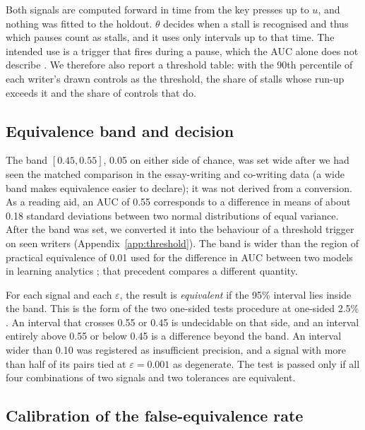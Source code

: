 Both signals are computed forward in time from the key presses up to $u$, and nothing was fitted to the holdout.
$\theta$ decides when a stall is recognised and thus which pauses count as stalls, and it uses only intervals up to that
time. The intended use is a trigger that fires during a pause, which the AUC alone does not
describe \cite{pelanek2015metrics}. We therefore also report a threshold table: with the 90th percentile of each
writer's drawn controls as the threshold, the share of stalls whose run-up exceeds it and the share of controls that do.

\subsection{Equivalence band and decision}

The band $[0.45, 0.55]$, 0.05 on either side of chance, was set wide after we had seen the matched comparison
in the essay-writing and co-writing data (a wide band makes equivalence easier to declare); it was not derived from a conversion. As a reading aid, an AUC of 0.55
corresponds to a difference in means of about 0.18 standard deviations between two normal distributions of equal
variance. After the band was set, we converted it into the behaviour of a threshold trigger on seen writers
(Appendix~\ref{app:threshold}). The band is wider than the region of practical equivalence of 0.01 used for the
difference in AUC between two models in learning analytics \cite{gardner2018evaluating}; that precedent compares a
different quantity.

For each signal and each $\varepsilon$, the result is \emph{equivalent} if the 95\% interval lies inside the band. This
is the form of the two one-sided tests procedure at one-sided 2.5\% \cite{lakens2017equivalence}. An interval that
crosses 0.55 or 0.45 is undecidable on that side, and an interval entirely above 0.55 or below 0.45 is a difference
beyond the band. An interval wider than 0.10 was registered as insufficient precision, and a signal with more than half
of its pairs tied at $\varepsilon = 0.001$ as degenerate. The test is passed only if all four combinations of two
signals and two tolerances are equivalent.

\subsection{Calibration of the false-equivalence rate}

